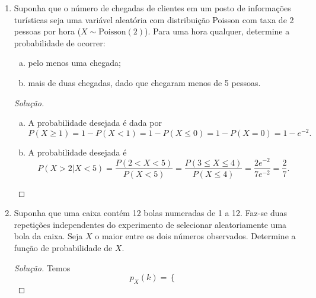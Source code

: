 \documentclass[../Notas.tex]{subfiles}
\begin{document}
\begin{enumerate}
\begin{proof}[Solução]
\begin{enumerate}
            \item Temos
            \[
            P(2,6<X<12,2) = P(3\leq X\leq 12) = P(X\leq 12) - P(X\leq 2) = 1/10.
            \]
            \item Temos
            \[
            P(8 < X \leq 10 \text{ ou } 30 < X \leq 32)
            = P(9\leq X\leq 10) + P(31\leq X\leq 32)
            = 1/25.
            \]
            \item Temos
            \[
            P(25\leq X\leq 30) = P(X\leq 30) - P(X\leq 24) = 3/50.
            \]
        \end{enumerate}
    \end{proof}
    \item Suponha que o número de chegadas de clientes em um posto de informações turísticas seja uma variável aleatória com distribuição Poisson com taxa de 2 pessoas por hora ($X\sim\text{Poisson}(2)$). Para uma hora qualquer, determine a probabilidade de ocorrer:
    \begin{enumerate}[a)]
    \item pelo menos uma chegada;
    \item mais de duas chegadas, dado que chegaram menos de 5 pessoas.
    \end{enumerate}
    \begin{proof}[Solução]
        \begin{enumerate}[a)]
            \item A probabilidade desejada é dada por
            \[
            P(X\geq 1) = 1 - P(X<1) = 1 - P(X\leq 0) = 1 - P(X=0) = 1 - e^{-2}.
            \]
            \item A probabilidade desejada é
            \[
            P(X>2|X<5) = \frac{P(2 < X < 5)}{P(X<5)} = \frac{P(3\leq X\leq 4)}{P(X\leq 4)}
            = \frac{2e^{-2}}{7e^{-2}} = \frac{2}{7}.
            \]
        \end{enumerate}
    \end{proof}
    \item Suponha que uma caixa contém 12 bolas numeradas de 1 a 12. Faz-se duas repetições independentes do experimento de selecionar aleatoriamente uma bola da caixa. Seja $X$ o maior entre os dois números observados. Determine a função de probabilidade de $X$.
    \begin{proof}[Solução]
        Temos
        \[
        p_X(k) = \begin{cases}

\end{cases}\]
\end{proof}
\end{enumerate}
\end{document}
